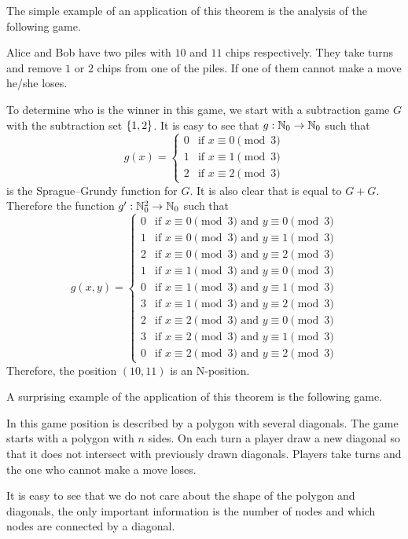 The simple example of an application of this theorem is the analysis of the
following game.
\begin{game}
\label{game:subtraction-1-2-3-out-of-10-11}
  Alice and Bob have two piles with $10$ and $11$ chips respectively.
  They take turns and remove $1$ or $2$ chips from one of the piles.
  If one of them cannot make a move he/she loses.
\end{game}

To determine who is the winner in this game, we start with a subtraction game
$G$ with the subtraction set $\set{1, 2}$. It is easy to see that 
$g : {\mathbb{N}}_0 \to {\mathbb{N}}_0$ such that
\[
  g(x) =
  \begin{cases}
    0 & \text{if } x \equiv 0 \pmod{3} \\
    1 & \text{if } x \equiv 1 \pmod{3} \\
    2 & \text{if } x \equiv 2 \pmod{3}
  \end{cases}
\]
is the Sprague--Grundy function for $G$. 
It is also clear that  is equal to 
$G + G$. Therefore the function $g' : {\mathbb{N}}_0^2 \to {\mathbb{N}}_0$ such that 
\[
  g(x, y) =
  \begin{cases}
    0 & \text{if } x \equiv 0 \pmod{3} \text{ and } y \equiv 0 \pmod{3}\\
    1 & \text{if } x \equiv 0 \pmod{3} \text{ and } y \equiv 1 \pmod{3}\\
    2 & \text{if } x \equiv 0 \pmod{3} \text{ and } y \equiv 2 \pmod{3}\\
    1 & \text{if } x \equiv 1 \pmod{3} \text{ and } y \equiv 0 \pmod{3}\\
    0 & \text{if } x \equiv 1 \pmod{3} \text{ and } y \equiv 1 \pmod{3}\\
    3 & \text{if } x \equiv 1 \pmod{3} \text{ and } y \equiv 2 \pmod{3}\\
    2 & \text{if } x \equiv 2 \pmod{3} \text{ and } y \equiv 0 \pmod{3}\\
    3 & \text{if } x \equiv 2 \pmod{3} \text{ and } y \equiv 1 \pmod{3}\\
    0 & \text{if } x \equiv 2 \pmod{3} \text{ and } y \equiv 2 \pmod{3}
  \end{cases}
\]
Therefore, the position $(10, 11)$ is an N-position.


A surprising example of the application of this theorem is the following game.
\begin{game}
\label{game:polygon}
  In this game position is described by a polygon with several diagonals. 
  The game starts with a polygon with $n$ sides. On each turn a player draw a
  new diagonal so that it does not intersect with previously drawn diagonals.
  Players take turns and the one who cannot make a move loses.
\end{game}
It is easy to see that we do not care about the shape of the polygon and
diagonals, the only important information is the number of nodes and which nodes
are connected by a diagonal. 

